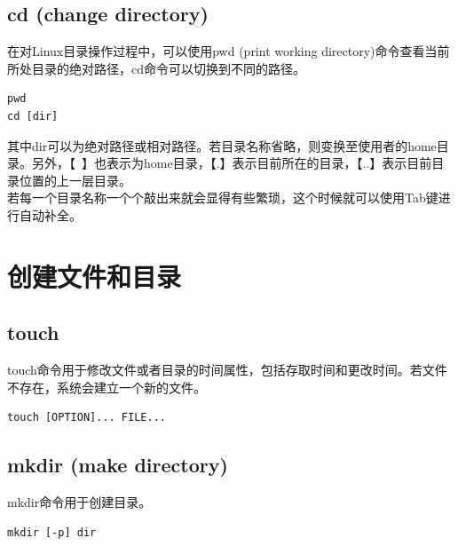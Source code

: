 \documentclass[12pt, openany, oneside]{book}
\begin{document}
\subsection{cd (change directory)}

在对Linux目录操作过程中，可以使用pwd (print working directory)命令查看当前所处目录的绝对路径，cd命令可以切换到不同的路径。

\vspace{-0.5cm}

\begin{lstlisting}
pwd
cd [dir]
\end{lstlisting}

其中dir可以为绝对路径或相对路径。若目录名称省略，则变换至使用者的home目录。另外，【~】也表示为home目录，【.】表示目前所在的目录，【..】表示目前目录位置的上一层目录。\\

若每一个目录名称一个个敲出来就会显得有些繁琐，这个时候就可以使用Tab键进行自动补全。

\newpage

\section{创建文件和目录}

\subsection{touch}

touch命令用于修改文件或者目录的时间属性，包括存取时间和更改时间。若文件不存在，系统会建立一个新的文件。

\vspace{-0.5cm}

\begin{lstlisting}
touch [OPTION]... FILE...
\end{lstlisting}

\subsection{mkdir (make directory)}

mkdir命令用于创建目录。

\vspace{-0.5cm}

\begin{lstlisting}
mkdir [-p] dir
\end{lstlisting}

\begin{table}[H]
    \centering
    \caption{mkdir参数说明}
\end{table}
\end{document}
